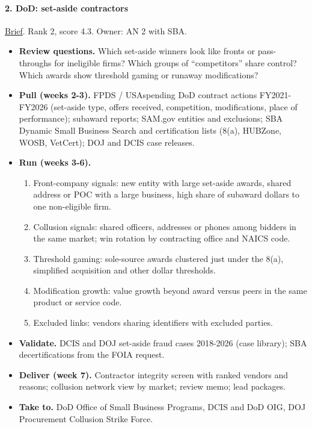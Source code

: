 \documentclass[letterpaper,11pt]{article}
\providecommand{\tightlist}{\setlength{\itemsep}{0pt}\setlength{\parskip}{0pt}}
\begin{document}
\hypertarget{dod-set-aside-contractors}{%
\paragraph{2. DoD: set-aside
contractors}\label{dod-set-aside-contractors}}

\href{agencies/dod.pdf}{Brief}. Rank 2, score 4.3. Owner: AN 2 with SBA.

\begin{itemize}
\tightlist
\item
  \textbf{Review questions.} Which set-aside winners look like fronts or
  pass-throughs for ineligible firms? Which groups of ``competitors''
  share control? Which awards show threshold gaming or runaway
  modifications?
\item
  \textbf{Pull (weeks 2-3).} FPDS / USAspending DoD contract actions
  FY2021-FY2026 (set-aside type, offers received, competition,
  modifications, place of performance); subaward reports; SAM.gov
  entities and exclusions; SBA Dynamic Small Business Search and
  certification lists (8(a), HUBZone, WOSB, VetCert); DOJ and DCIS case
  releases.
\item
  \textbf{Run (weeks 3-6).}

  \begin{enumerate}
  \def\labelenumi{\arabic{enumi}.}
  \tightlist
  \item
    Front-company signals: new entity with large set-aside awards,
    shared address or POC with a large business, high share of subaward
    dollars to one non-eligible firm.
  \item
    Collusion signals: shared officers, addresses or phones among
    bidders in the same market; win rotation by contracting office and
    NAICS code.
  \item
    Threshold gaming: sole-source awards clustered just under the 8(a),
    simplified acquisition and other dollar thresholds.
  \item
    Modification growth: value growth beyond award versus peers in the
    same product or service code.
  \item
    Excluded links: vendors sharing identifiers with excluded parties.
  \end{enumerate}
\item
  \textbf{Validate.} DCIS and DOJ set-aside fraud cases 2018-2026 (case
  library); SBA decertifications from the FOIA request.
\item
  \textbf{Deliver (week 7).} Contractor integrity screen with ranked
  vendors and reasons; collusion network view by market; review memo;
  lead packages.
\item
  \textbf{Take to.} DoD Office of Small Business Programs, DCIS and DoD
  OIG, DOJ Procurement Collusion Strike Force.
\end{itemize}
\end{document}
